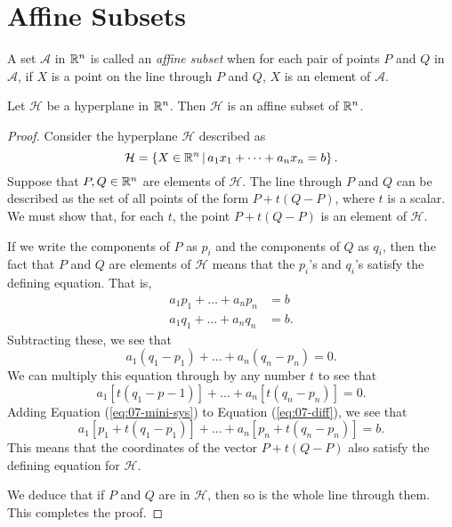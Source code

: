 \documentclass[elementsmain.tex]{subfiles}
\begin{document}
\section{Affine Subsets}

\begin{definition} A set $\mathcal{A}$ in $\mathbb{R}^n$ is called an \emph{affine subset} when for each pair of points $P$ and $Q$ in $\mathcal{A}$, if $X$ is a point on the line through $P$ and $Q$, $X$ is an element of $\mathcal{A}$.
\end{definition}

\begin{theorem}\label{thm:hyp-is-aff}
Let $\mathcal{H}$ be a hyperplane in $\mathbb{R}^n$. Then $\mathcal{H}$ is an affine subset of $\mathbb{R}^n$.
\end{theorem}

\begin{proof}
Consider the hyperplane $\mathcal{H}$ described as
\[
\mathcal{H} = \left\{ X \in \mathbb{R}^n  \,\middle|\, a_1 x_1 + \dots + a_n x_n = b  \right\}.
\]
Suppose that $P, Q \in \mathbb{R}^n$ are elements of $\mathcal{H}$. The line through $P$ and $Q$ can be described as the set of all points of the form $P + t (Q-P)$, where $t$ is a scalar. We must show that, for each $t$, the point $P+t(Q-P)$ is an element of $\mathcal{H}$. 

If we write the components of $P$ as $p_i$ and the components of $Q$ as $q_i$, then the fact that $P$ and $Q$ are elements of $\mathcal{H}$ means that the $p_i$'s and $q_i$'s satisfy the defining equation. That is, 
\begin{align}\label{eq:07-mini-sys}
a_1 p_1 + \dots + a_n p_n &= b \\
a_1 q_1 + \dots + a_n q_n &= b.
\end{align}
Subtracting these, we see that 
\[
a_1 (q_1-p_1) + \dots + a_n (q_n-p_n) = 0.
\]
We can multiply this equation through by any number $t$ to see that 
\begin{equation}\label{eq:07-diff}
a_1 [t(q_1 - p-1)] + \dots + a_n [ t(q_n-p_n) ] = 0.
\end{equation}
Adding Equation (\ref{eq:07-mini-sys}) to Equation (\ref{eq:07-diff}), we see that
\[
a_1 \left[ p_1 + t(q_1 - p_1)\right] + \dots + a_n \left[ p_n + t(q_n- p_n) \right] = b.
\]
This means that the coordinates of the vector $P+t(Q-P)$ also satisfy the defining equation for $\mathcal{H}$.

We deduce that if $P$ and $Q$ are in $\mathcal{H}$, then so is the whole line through them. This completes the proof.
\end{proof}
\end{document}
